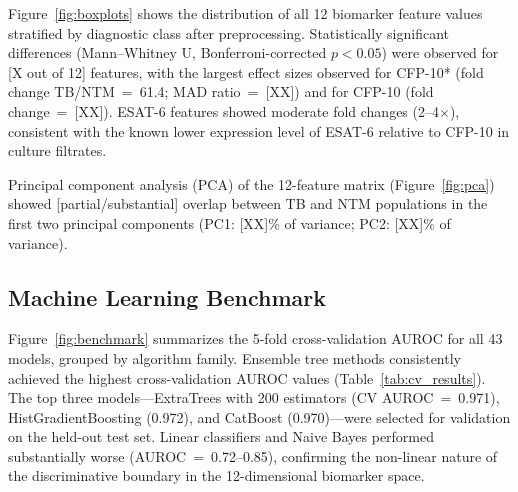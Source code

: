 \documentclass[journal=ancham, manuscript=article, layout=traditional]{achemso}
\begin{document}
Figure~\ref{fig:boxplots} shows the distribution of all 12 biomarker
feature values stratified by diagnostic class after preprocessing.
Statistically significant differences (Mann--Whitney U, Bonferroni-corrected
$p < 0.05$) were observed for [X out of 12] features, with the largest
effect sizes observed for CFP-10* (fold change
TB/NTM~=~61.4; MAD ratio~=~[XX]) and for CFP-10 (fold change~=~[XX]).
ESAT-6 features showed moderate fold changes (2--4$\times$), consistent
with the known lower expression level of ESAT-6 relative to
CFP-10 in culture filtrates.\cite{Sorensen1995}

Principal component analysis (PCA) of the 12-feature matrix
(Figure~\ref{fig:pca}) showed [partial/substantial] overlap between TB
and NTM populations in the first two principal components (PC1: [XX]\%
of variance; PC2: [XX]\% of variance).

\subsection{Machine Learning Benchmark}

Figure~\ref{fig:benchmark} summarizes the 5-fold cross-validation
AUROC for all 43 models, grouped by algorithm family.
Ensemble tree methods consistently achieved the highest
cross-validation AUROC values (Table~\ref{tab:cv_results}).
The top three models—ExtraTrees with 200 estimators
(CV AUROC~=~0.971), HistGradientBoosting (0.972), and
CatBoost (0.970)—were selected for validation on the held-out test set.
Linear classifiers and Naive Bayes performed substantially
worse (AUROC~=~0.72--0.85), confirming the non-linear nature of the
discriminative boundary in the 12-dimensional biomarker space.
\end{document}
